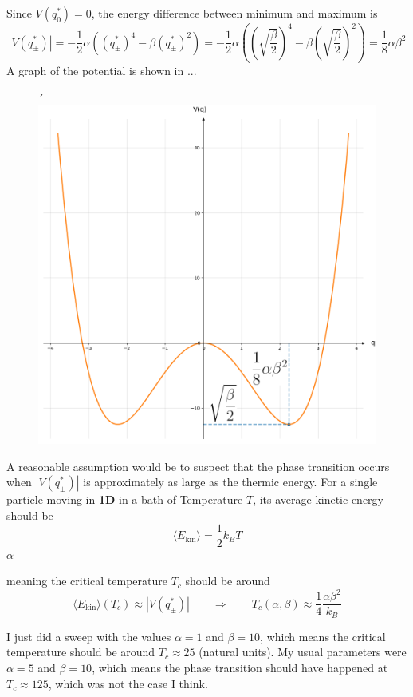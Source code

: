 	Since $V(q^*_0) = 0$, the energy difference between minimum and maximum is
	\begin{equation}
		|V(q^*_\pm)| =	- \frac{1}{2}\alpha \left((q^*_\pm)^4 - \beta (q^*_\pm)^2\right) =  -\frac{1}{2}\alpha \left(\left(\sqrt{\frac{\beta}{2}}\right)^4 - \beta \left(\sqrt{\frac{\beta}{2}}\right)^2\right)	=	\frac{1}{8} \alpha \beta^2
	\end{equation}
	A graph of the potential is shown in ...
	\begin{figure}
		\centering´
		\includegraphics[width=12cm]{graphics/potential.png}
	\end{figure}
	A reasonable assumption would be to suspect that the phase transition occurs when $|V(q^*_\pm)|$ is approximately as large as the thermic energy. For a single particle moving in \textbf{1D} in a bath of Temperature $T$, its average kinetic energy should be
	\begin{equation}
		\langle E_{\text{kin}} \rangle = \frac{1}{2} k_B T
	\end{equation}$\alpha$
	
	meaning the critical temperature $T_c$ should be around
	\begin{equation}
		\langle E_{\text{kin}} \rangle (T_c) \approx |V(q^*_\pm)| \qquad \Rightarrow \qquad T_c(\alpha, \beta) \approx \frac{1}{4} \frac{\alpha \beta^2}{k_B}
	\end{equation}
	
	I just did a sweep with the values $\alpha = 1$ and $\beta = 10$, which means the critical temperature should be around $T_c \approx 25$ (natural units). My usual parameters were $\alpha = 5$ and $\beta = 10$, which means the phase transition should have happened at $T_c \approx 125$, which was not the case I think.
	
